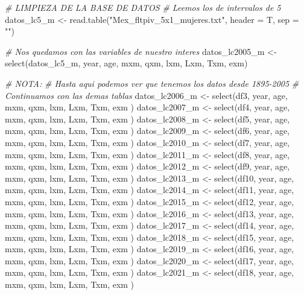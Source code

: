 \documentclass[
]{article}
\newenvironment{Shaded}{\begin{snugshade}}{\end{snugshade}}
\newcommand{\AttributeTok}[1]{\textcolor[rgb]{0.77,0.63,0.00}{#1}}
\newcommand{\CommentTok}[1]{\textcolor[rgb]{0.56,0.35,0.01}{\textit{#1}}}
\newcommand{\FunctionTok}[1]{\textcolor[rgb]{0.00,0.00,0.00}{#1}}
\newcommand{\NormalTok}[1]{#1}
\newcommand{\OtherTok}[1]{\textcolor[rgb]{0.56,0.35,0.01}{#1}}
\newcommand{\StringTok}[1]{\textcolor[rgb]{0.31,0.60,0.02}{#1}}
\begin{document}
\begin{Shaded}
\begin{Highlighting}[]
\CommentTok{\# LIMPIEZA DE LA BASE DE DATOS}
\CommentTok{\# Leemos los de intervalos de 5}
\NormalTok{datos\_lc5\_m }\OtherTok{\textless{}{-}} \FunctionTok{read.table}\NormalTok{(}\StringTok{"Mex\_fltpiv\_5x1\_mujeres.txt"}\NormalTok{, }\AttributeTok{header =}\NormalTok{ T, }\AttributeTok{sep =} \StringTok{""}\NormalTok{)}

\CommentTok{\# Nos quedamos con las variables de nuestro interes}
\NormalTok{datos\_lc2005\_m }\OtherTok{\textless{}{-}} \FunctionTok{select}\NormalTok{(datos\_lc5\_m, year, age, mxm, qxm, lxm, Lxm, Txm, exm)}

\CommentTok{\# NOTA:}
\CommentTok{\# Hasta aqui podemos ver que tenemos los datos desde 1895{-}2005}
\CommentTok{\# Continuamos con las demas tablas}
\NormalTok{datos\_lc2006\_m }\OtherTok{\textless{}{-}} \FunctionTok{select}\NormalTok{(df3,  year, age, mxm, qxm, lxm, Lxm, Txm, exm )}
\NormalTok{datos\_lc2007\_m }\OtherTok{\textless{}{-}} \FunctionTok{select}\NormalTok{(df4,  year, age, mxm, qxm, lxm, Lxm, Txm, exm )}
\NormalTok{datos\_lc2008\_m }\OtherTok{\textless{}{-}} \FunctionTok{select}\NormalTok{(df5,  year, age, mxm, qxm, lxm, Lxm, Txm, exm )}
\NormalTok{datos\_lc2009\_m }\OtherTok{\textless{}{-}} \FunctionTok{select}\NormalTok{(df6, year, age, mxm, qxm, lxm, Lxm, Txm, exm )}
\NormalTok{datos\_lc2010\_m }\OtherTok{\textless{}{-}} \FunctionTok{select}\NormalTok{(df7, year, age, mxm, qxm, lxm, Lxm, Txm, exm )}
\NormalTok{datos\_lc2011\_m }\OtherTok{\textless{}{-}} \FunctionTok{select}\NormalTok{(df8, year, age, mxm, qxm, lxm, Lxm, Txm, exm )}
\NormalTok{datos\_lc2012\_m }\OtherTok{\textless{}{-}} \FunctionTok{select}\NormalTok{(df9, year, age, mxm, qxm, lxm, Lxm, Txm, exm )}
\NormalTok{datos\_lc2013\_m }\OtherTok{\textless{}{-}} \FunctionTok{select}\NormalTok{(df10, year, age, mxm, qxm, lxm, Lxm, Txm, exm )}
\NormalTok{datos\_lc2014\_m }\OtherTok{\textless{}{-}} \FunctionTok{select}\NormalTok{(df11, year, age, mxm, qxm, lxm, Lxm, Txm, exm )}
\NormalTok{datos\_lc2015\_m }\OtherTok{\textless{}{-}} \FunctionTok{select}\NormalTok{(df12, year, age, mxm, qxm, lxm, Lxm, Txm, exm )}
\NormalTok{datos\_lc2016\_m }\OtherTok{\textless{}{-}} \FunctionTok{select}\NormalTok{(df13, year, age, mxm, qxm, lxm, Lxm, Txm, exm )}
\NormalTok{datos\_lc2017\_m }\OtherTok{\textless{}{-}} \FunctionTok{select}\NormalTok{(df14, year, age, mxm, qxm, lxm, Lxm, Txm, exm )}
\NormalTok{datos\_lc2018\_m }\OtherTok{\textless{}{-}} \FunctionTok{select}\NormalTok{(df15, year, age, mxm, qxm, lxm, Lxm, Txm, exm )}
\NormalTok{datos\_lc2019\_m }\OtherTok{\textless{}{-}} \FunctionTok{select}\NormalTok{(df16, year, age, mxm, qxm, lxm, Lxm, Txm, exm )}
\NormalTok{datos\_lc2020\_m }\OtherTok{\textless{}{-}} \FunctionTok{select}\NormalTok{(df17, year, age, mxm, qxm, lxm, Lxm, Txm, exm )}
\NormalTok{datos\_lc2021\_m }\OtherTok{\textless{}{-}} \FunctionTok{select}\NormalTok{(df18, year, age, mxm, qxm, lxm, Lxm, Txm, exm )}



\end{Highlighting}
\end{Shaded}
\end{document}
